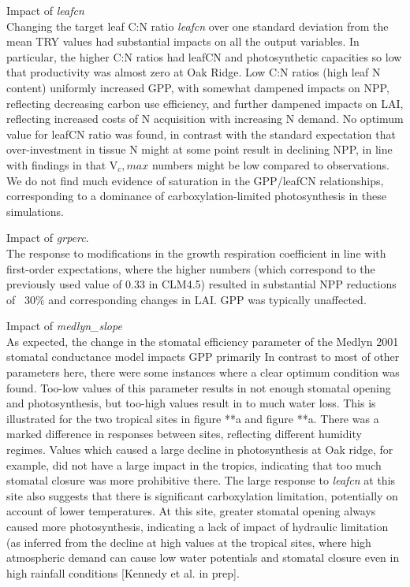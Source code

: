 \documentclass[draft,linenumbers]{agujournal}
\begin{document}
Impact of \emph{leafcn}\\
Changing the target leaf C:N ratio \emph{leafcn} over one standard deviation from the mean TRY values had substantial impacts on all the output variables. In particular, the higher C:N ratios had leafCN and photosynthetic capacities so low that productivity was almost zero at Oak Ridge. Low C:N ratios (high leaf N content) uniformly increased GPP, with somewhat dampened impacts on NPP, reflecting decreasing carbon use efficiency, and further dampened impacts on LAI, reflecting increased costs of N acquisition with increasing N demand.  No optimum value for leafCN ratio was found, in contrast with the standard expectation that over-investment in tissue N might at some point result in declining NPP, in line with findings in \cite{lawrence} that V${_c,max}$ numbers might be low compared to observations. We do not find much evidence of saturation in the GPP/leafCN relationships, corresponding to a dominance of carboxylation-limited photosynthesis in these simulations.

Impact of \emph{grperc}.\\
The response to modifications in the growth respiration coefficient in line with first-order expectations, where the higher numbers (which correspond to the previously used value of 0.33 in CLM4.5) resulted in substantial NPP reductions of ~30\% and corresponding changes in LAI. GPP was typically unaffected.

Impact of \emph{medlyn\_slope}\\
As expected, the change in the stomatal efficiency parameter of the Medlyn 2001 stomatal conductance model impacts GPP primarily In contrast to most of other parameters here, there were some instances where a clear optimum condition was found. Too-low values of this parameter results in not enough stomatal opening and photosynthesis, but too-high values result in to much water loss. This is illustrated for the two tropical sites in figure **a and figure **a. There was a marked difference in responses between sites, reflecting different humidity regimes. Values which caused a large decline in photosynthesis at Oak ridge, for example, did not have a large impact in the tropics, indicating that too much stomatal closure was more prohibitive there. The large response to \emph{leafcn} at this site also suggests that there is significant carboxylation limitation, potentially on account of lower temperatures. At this site, greater stomatal opening always caused more photosynthesis, indicating a lack of impact of hydraulic limitation (as inferred from the decline at high values at the tropical sites, where high atmospheric demand can cause low water potentials and stomatal closure even in high rainfall conditions [Kennedy et al. in prep].
\end{document}

